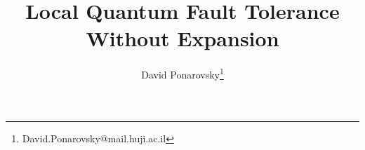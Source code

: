 \documentclass[manuscript,screen,review]{acmart}
\begin{document}

\title{ Local Quantum Fault Tolerance Without Expansion  }
\author{David Ponarovsky\footnote{David.Ponarovsky@mail.huji.ac.il}}
\maketitle

\newcommand*{\xb}{\mathbf{x}}

\ifdefined\SWEEPHEA
\else 
  \newcommand*{\SWEEPHEA}{}
\newcommand{\History}[1]{H_{#1}}
  \newcommand{\Time}[1]{T(#1)}
  \newcommand{\Excuse}[1]{\mathbf{Excuse}(#1)}
  \newcommand{\Excusei}[1]{\mathbf{Excuse}_{i}(#1)}
  \newcommand{\Size}[1]{\mathbf{Size}(#1)}
  \newcommand{\Span}[1]{\mathbf{Span}(#1)}
  \newcommand{\pre}[1]{\text{pre}(#1)}
  \newcommand{\poli}[1]{\text{pole}_{i}(#1)}
  \newcommand{\prei}[1]{\text{pre}_{i}(#1)}
  \newcommand{\predd}[1]{\text{pre}_{d+1}(#1)}
  \newcommand{\rotf}[2]{\theta_{#1 ,#2}}
  \newcommand*{\rotfs}{\rotf{v}{S^{\prime}}}
  \newcommand{\rotfv}[2]{\mathbf{\rotf{#1}{#2} }}
  \newcommand*{\rotfvs}{\mathbf{\rotfs{} }}
\fi



\tableofcontents
\newpage


























\printbibliography

\end{document}
